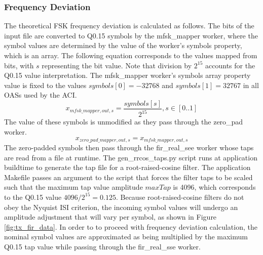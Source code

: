 \subsubsection{Frequency Deviation}
The theoretical FSK frequency deviation is calculated as follows. The bits of the input file are converted to Q0.15 symbols by the mfsk\_mapper worker, where the symbol values are determined by the value of the worker's symbols property, which is an array. The following equation corresponds to the values mapped from bits, with $s$ representing the bit value. Note that division by $2^{15}$ accounts for the Q0.15 value interpretation. The mfsk\_mapper worker's symbols array property value is fixed to the values $symbols[0]=-32768$ and $symbols[1]=32767$ in all OASs used by the ACI.
	\begin{equation} \label{eq:map_out_val}
		x_{mfsk\_mapper,out,s}=\frac{symbols[s]}{2^{15}},
    s \in [0..1] %
	\end{equation}
The value of these symbols is unmodified as they pass through the zero\_pad worker. 
	\begin{equation} \label{eq:zp_out_val}
		x_{zero\_pad\_mapper,out,s}=x_{mfsk\_mapper,out,s}
	\end{equation}
The zero-padded symbols then pass through the fir\_real\_see worker whose taps are read from a file at runtime. The gen\_rrcos\_taps.py script runs at application buildtime to generate the tap file for a root-raised-cosine filter. The application Makefile passes an argument to the script that forces the filter taps to be scaled such that the maximum tap value amplitude $maxTap$ is 4096, which corresponds to the Q0.15 value $4096/2^{15}=0.125$. Because root-raised-cosine filters do not obey the Nyquist ISI criterion, the incoming symbol values will undergo an amplitude adjustment that will vary per symbol, as shown in Figure \ref{fig:tx_fir_data}. In order to to proceed with frequency deviation calculation, the nominal symbol values are approximated as being multiplied by the maximum Q0.15 tap value while passing through the fir\_real\_sse worker. 
